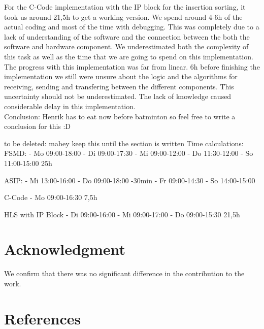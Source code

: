 \documentclass[conference]{IEEEtran}
\begin{document}
For the C-Code implementation with the IP block for the insertion sorting, it took us around 21,5h to get a working version. We spend around 4-6h of the actual coding and most of the time with debugging. This was completely due to a lack of understanding of the software and the connection between the both the software and hardware component. We underestimated both the complexity of this task as well as the time that we are going to spend on this implementation. The progress with this implementation was far from linear. 6h before finishing the implementation we still were unsure about the logic and the algorithms for receiving, sending and transfering between the different components. This uncertainty should not be underestimated. The lack of knowledge caused considerable delay in this implementation. \\
Conclusion: Henrik has to eat now before batminton so feel free to write a conclusion for this :D

to be deleted: 
mabey keep this until the section is written
Time calculations:
FSMD:
- Mo 09:00-18:00
- Di 09:00-17:30
- Mi 09:00-12:00
- Do 11:30-12:00
- So 11:00-15:00
25h

ASIP:
- Mi 13:00-16:00
- Do 09:00-18:00 -30min
- Fr 09:00-14:30
- So 14:00-15:00


C-Code
- Mo 09:00-16:30
7,5h

HLS with IP Block
- Di 09:00-16:00
- Mi 09:00-17:00
- Do 09:00-15:30
21,5h



\section*{Acknowledgment}

We confirm that there was no significant difference in the contribution to the work.

\section*{References}

\printbibliography
\end{document}
